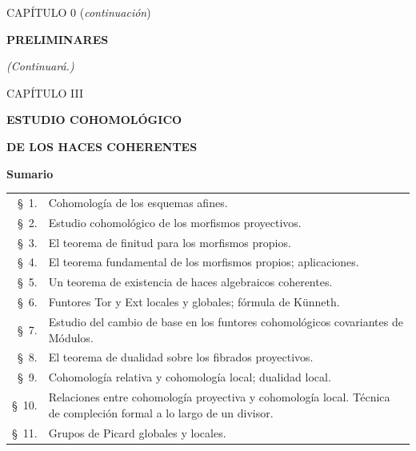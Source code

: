 \clearpage
\thispagestyle{plain}
\label{chapter:0III-fr}

\begin{center}
{\large CAPÍTULO 0 (\textit{continuación})\footnotemark\par}
\vspace{1.5em}
{\Large\bfseries PRELIMINARES\par}
\end{center}


\setcounter{section}{7}







\begin{flushright}
\textit{(Continuará.)}
\end{flushright}

\clearpage
{}
\thispagestyle{empty}
\null
\clearpage
\thispagestyle{plain}
\label{chapter:III-fr}

\begin{center}
{\large CAPÍTULO III\par}
\vspace{1.5em}
{\Large\bfseries ESTUDIO COHOMOLÓGICO\par}
{\Large\bfseries DE LOS HACES COHERENTES\par}
\vspace{1.8em}
{\bfseries Sumario\par}
\end{center}

\medskip
\begin{tabular}{@{}r@{\ }p{}@{}}
\S~1. & Cohomología de los esquemas afines.\\
\S~2. & Estudio cohomológico de los morfismos proyectivos.\\
\S~3. & El teorema de finitud para los morfismos propios.\\
\S~4. & El teorema fundamental de los morfismos propios; aplicaciones.\\
\S~5. & Un teorema de existencia de haces algebraicos coherentes.\\
\S~6. & Funtores Tor y Ext locales y globales; fórmula de Künneth.\\
\S~7. & Estudio del cambio de base en los funtores cohomológicos covariantes de Módulos.\\
\S~8. & El teorema de dualidad sobre los fibrados proyectivos.\\
\S~9. & Cohomología relativa y cohomología local; dualidad local.\\
\S~10. & Relaciones entre cohomología proyectiva y cohomología local. Técnica de compleción formal a lo largo de un divisor.\\
\S~11. & Grupos de Picard globales y locales\footnotemark.
\end{tabular}


